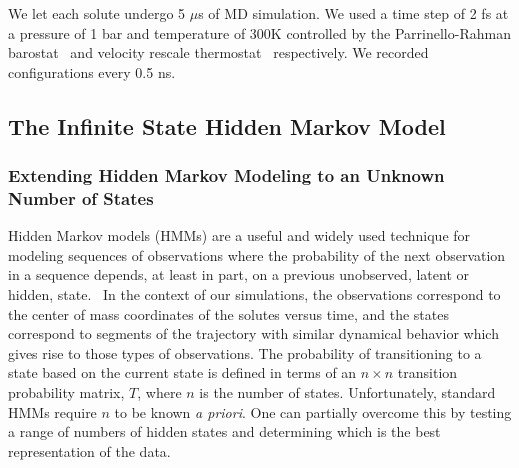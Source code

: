 \documentclass[journal=jpcbfk,manuscript=article]{achemso}
\begin{document}
  We let each solute undergo 5 $\mu$s of MD simulation. We used a time step of 2 fs
  at a pressure of 1 bar and temperature of 300K controlled by the Parrinello-Rahman 
  barostat~\cite{parrinello_polymorphic_1981} and velocity rescale 
  thermostat~\cite{bussi_canonical_2007} respectively. We recorded configurations every 0.5 ns.

  \subsection{The Infinite State Hidden Markov Model}\label{method:IHMM}

  \subsubsection*{Extending Hidden Markov Modeling to an Unknown Number of States}
  
  Hidden Markov models (HMMs) are a useful and widely used technique for modeling
  sequences of observations where the probability of the next observation in a 
  sequence depends, at least in part, on a previous unobserved, latent or hidden,
  state.~\cite{beal_infinite_2002} In the context of our simulations, the observations
  correspond to the center of mass coordinates of the solutes versus time, and the
  states correspond to segments of the trajectory with similar dynamical behavior 
  which gives rise to those types of observations. The probability of transitioning 
  to a state based on the current state is defined in terms of an $n\times n$ 
  transition probability matrix, $T$, where $n$ is the number of states. Unfortunately,
  standard HMMs require $n$ to be known \textit{a priori}. One can partially overcome
  this by testing a range of numbers of hidden states and determining which is the
  best representation of the data.~\cite{pohle_selecting_2017}
  
\end{document}
